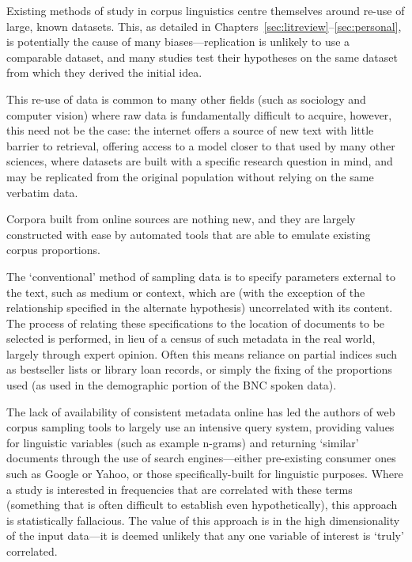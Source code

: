 

Existing methods of study in corpus linguistics centre themselves around re-use of large, known datasets.  This, as detailed in Chapters~\ref{sec:litreview}--\ref{sec:personal}, is potentially the cause of many biases---replication is unlikely to use a comparable dataset, and many studies test their hypotheses on the same dataset from which they derived the initial idea.

This re-use of data is common to many other fields (such as sociology\cite{mcgrath1986british} and computer vision\cite{griffin2007caltech}) where raw data is fundamentally difficult to acquire, however, this need not be the case: the internet offers a source of new text with little barrier to retrieval, offering access to a model closer to that used by many other sciences, where datasets are built with a specific research question in mind, and may be replicated from the original population without relying on the same verbatim data.

Corpora built from online sources are nothing new, and they are largely constructed with ease by automated tools that are able to emulate existing corpus proportions.

The `conventional' method of sampling data is to specify parameters external to the text, such as medium or context, which are (with the exception of the relationship specified in the alternate hypothesis) uncorrelated with its content.  The process of relating these specifications to the location of documents to be selected %
is performed, in lieu of a census of such metadata in the real world, largely through expert opinion.  Often this means reliance on partial indices such as bestseller lists or library loan records, or simply the fixing of the proportions used (as used in the demographic portion of the BNC spoken data).


The lack of availability of consistent metadata online has led the authors of web corpus sampling tools to largely use an intensive query system, providing values for linguistic variables (such as example n-grams) and returning `similar' documents through the use of search engines---either pre-existing consumer ones such as Google or Yahoo, or those specifically-built for linguistic purposes.  Where a study is interested in frequencies that are correlated with these terms (something that is often difficult to establish even hypothetically), this approach is statistically fallacious.  The value of this approach is in the high dimensionality of the input data---it is deemed unlikely that any one variable of interest is `truly' correlated.


